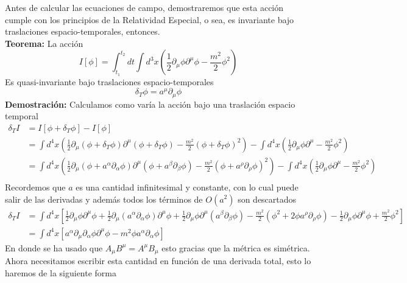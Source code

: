 \documentclass[../main.tex]{subfiles}
\begin{document}
Antes de calcular las ecuaciones de campo, demostraremos que esta acción cumple con los principios de la Relatividad Especial, o sea, es invariante bajo traslaciones espacio-temporales, entonces. \\
\textbf{Teorema:} La acción
\begin{equation}
  I[\phi] = \int_{t_1}^{t_2} dt \int d^3 x \left( \frac{1}{2}\partial_\mu \phi \partial^\mu \phi - \frac{m^2}{2}\phi^2 \right)
\end{equation}
Es quasi-invariante bajo traslaciones espacio-temporales
\begin{equation}
  \delta_T \phi = a^\mu \partial_\mu \phi
\end{equation}
\textbf{Demostración:} Calculamos como varía la acción bajo una traslación espacio temporal
\begin{align*}
  \delta_T I  & = I [\phi + \delta_T\phi] - I[\phi] \\
  & = \int d^4x \left( \frac{1}{2}\partial_\mu \left( \phi + \delta_T \phi \right) \partial^\mu \left( \phi + \delta_T \phi \right)-\frac{m^2}{2}\left( \phi + \delta_T \phi \right)^2\right) - \int d^4 x \left( \frac{1}{2}\partial_\mu \phi \partial^\mu - \frac{m^2}{2}\phi^2  \right) \\
  & = \int d^4x \left( \frac{1}{2}\partial_\mu \left( \phi + a^\alpha \partial_\alpha \phi \right) \partial^\mu \left( \phi + a^\beta \partial_\beta \phi \right) - \frac{m^2}{2}\left( \phi + a^\rho \partial_\rho \phi \right)^2 \right)-  \int d^4 x \left( \frac{1}{2}\partial_\mu \phi \partial^\mu - \frac{m^2}{2}\phi^2  \right) \\
\end{align*}
Recordemos que $a$ es una cantidad infinitesimal y constante, con lo cual puede salir de las derivadas y además todos los términos de $O(a^2)$ son descartados
\begin{align*}
  \delta_T I & = \int d^4x\left[ \frac{1}{2}\partial_\mu \phi \partial^\mu \phi + \frac{1}{2}\partial_\mu \left( a^\alpha \partial_\alpha \phi \right) \partial^\mu \phi + \frac{1}{2}\partial_\mu\phi \partial^\mu \left( a^\beta \partial_\beta \phi \right) - \frac{m^2}{2}\left( \phi^2 + 2\phi a^\rho \partial_\rho \phi \right) - \frac{1}{2}\partial_\mu \phi \partial^\mu \phi + \frac{m^2}{2}\phi^2 \right] \\
  & = \int d^4x \left[ a^\alpha \partial_\mu \partial_\alpha \phi \partial^\mu \phi - m^2\phi a^\alpha \partial_\alpha \phi \right]
\end{align*}
En donde se ha usado que $A_\mu B^\mu = A^\mu B_\mu$ esto gracias que la métrica es simétrica. Ahora necesitamos escribir esta cantidad en función de una derivada total, esto lo haremos de la siguiente forma
\end{document}
